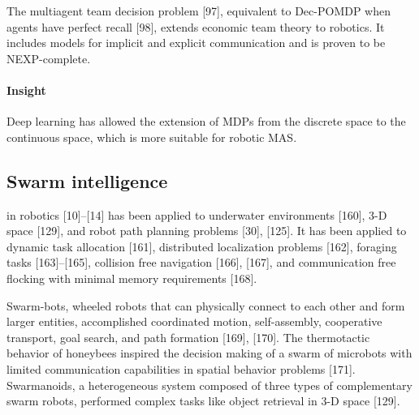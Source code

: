 \documentclass{article}
\begin{document}
			The multiagent team decision problem \citet{rizk-2018-decision-making-in-multiagent-systems-a-survey}[97], equivalent to Dec-POMDP when agents have perfect recall \cite{rizk-2018-decision-making-in-multiagent-systems-a-survey}[98], extends economic team theory to robotics.  It includes models for implicit and explicit communication and is proven to be NEXP-complete. 
			
			\paragraph{Insight}  Deep learning has allowed the extension of MDPs from the discrete space to the
			continuous space, which is more suitable for robotic MAS.
			
   		
   		\subsection{Swarm intelligence}
   		in robotics \citet{rizk-2018-decision-making-in-multiagent-systems-a-survey}[10]–[14] has been applied to underwater environments \citet{rizk-2018-decision-making-in-multiagent-systems-a-survey}[160], 3-D space \citet{rizk-2018-decision-making-in-multiagent-systems-a-survey}[129], and robot path planning problems \citet{rizk-2018-decision-making-in-multiagent-systems-a-survey}[30], [125]. It has been applied to dynamic task allocation \citet{rizk-2018-decision-making-in-multiagent-systems-a-survey}[161], distributed localization problems \citet{rizk-2018-decision-making-in-multiagent-systems-a-survey}[162], foraging tasks \citet{rizk-2018-decision-making-in-multiagent-systems-a-survey}[163]–[165], collision free navigation \citet{rizk-2018-decision-making-in-multiagent-systems-a-survey}[166], [167], and communication free flocking with minimal memory requirements \citet{rizk-2018-decision-making-in-multiagent-systems-a-survey}[168].  
   		
   		Swarm-bots, wheeled robots that can physically connect to each other and form larger entities, accomplished coordinated motion, self-assembly, cooperative transport, goal search, and path formation \citet{rizk-2018-decision-making-in-multiagent-systems-a-survey}[169], [170]. The thermotactic behavior of honeybees inspired the decision making of a swarm of microbots with limited communication capabilities in spatial behavior problems \citet{rizk-2018-decision-making-in-multiagent-systems-a-survey}[171]. Swarmanoids, a heterogeneous system composed of three types of complementary swarm robots, performed
   		complex tasks like object retrieval in 3-D space \citet{rizk-2018-decision-making-in-multiagent-systems-a-survey}[129].
\end{document}
